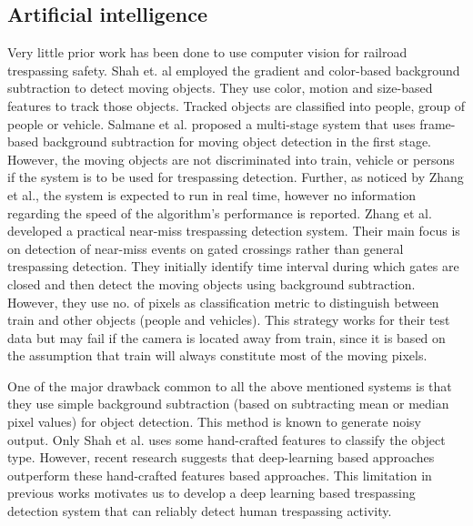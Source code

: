 \subsection{Artificial intelligence} Very little prior work has been done to use computer vision for railroad trespassing safety. Shah et. al\cite{shah2007automated} employed the gradient and color-based background subtraction to detect moving objects. They use color, motion and size-based features to track those objects. Tracked objects are classified into people, group of people or vehicle. Salmane et al.\cite{salmane2015video} proposed a multi-stage system that uses frame-based background subtraction for moving object detection in the first stage. However, the moving objects are not discriminated into train, vehicle or persons if the system is to be used for trespassing detection. Further, as noticed by Zhang et al.\cite{zhang2018automated}, the system is expected to run in real time, however no information regarding the
speed of the algorithm's performance is reported. Zhang et al.\cite{zhang2018automated} developed a practical near-miss trespassing detection system. Their main focus is on detection of near-miss events on gated crossings rather than general trespassing detection. They initially identify time interval during which gates are closed and then detect the moving objects using background subtraction. However, they use no. of pixels as classification metric to distinguish between train and other objects (people and vehicles). This strategy works for their test data but may fail if the camera is located away from train, since it is based on the assumption that train will always constitute most of the moving pixels. 

One of the major drawback common to all the above mentioned systems is that they use simple background subtraction (based on subtracting mean or median pixel values) for object detection. This method is known to generate noisy output\cite{stauffer1999adaptive}. Only Shah et al.\cite{shah2007automated} uses some hand-crafted features to classify the object type. However, recent research suggests that deep-learning based approaches outperform these hand-crafted features based approaches\cite{benenson2014ten}. This limitation in previous works motivates us to develop a deep learning based trespassing detection system that can reliably detect human trespassing activity. 

